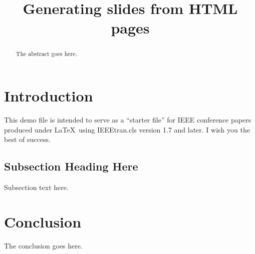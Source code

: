 \documentclass[conference, compsoc]{IEEEtran}
\begin{document}
%
\title{Generating slides from HTML pages}


\author{
\and
{}
\and
{}
}


\maketitle


\begin{abstract}
The abstract goes here.
\end{abstract}


\section{Introduction}
This demo file is intended to serve as a ``starter file''
for IEEE conference papers produced under \LaTeX\ using
IEEEtran.cls version 1.7 and later.
I wish you the best of success. \cite{test}

\subsection{Subsection Heading Here}
Subsection text here.


\section{Conclusion}
The conclusion goes here.

{\small


}
\end{document}
